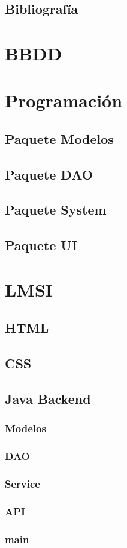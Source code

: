 \documentclass{article}
\begin{document}
\subsection{Bibliografía}
\appendix
\begin{appendices}
  \section{BBDD}\label{appendix:BBDD}
  
  \section{Programación}\label{appendix:programacion}
  \subsection{Paquete Modelos}
  
  \subsection{Paquete DAO}
  
  \subsection{Paquete System}
  
  \subsection{Paquete UI}
  
  \section{LMSI}\label{appendix:LMSI}
  \subsection{HTML}
  
  \subsection{CSS}
  
  \subsection{Java Backend}
  \subsubsection{Modelos}
  
  \subsubsection{DAO}
  
  \subsubsection{Service}
  
  \subsubsection{API}
  
  \subsubsection{main}
  
\end{appendices}
\end{document}

